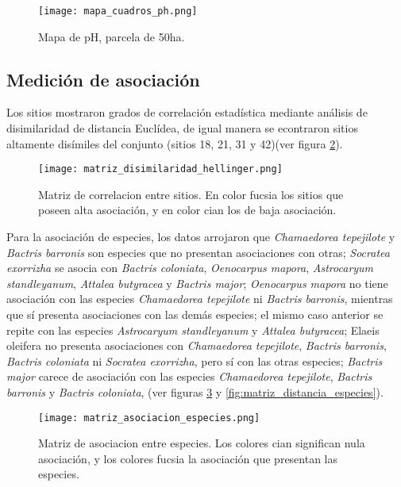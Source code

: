 \documentclass[11pt,]{article}
\begin{document}
\begin{figure}
\centering
\texttt{[image: mapa\_cuadros\_ph.png]}
\caption{Mapa de pH, parcela de 50ha. \label{fig:mapa_cuadros_pH}}
\end{figure}

\subsection{Medición de
asociación}\label{mediciuxf3n-de-asociaciuxf3n-1}

Los sitios mostraron grados de correlación estadística mediante análisis
de disimilaridad de distancia Euclídea, de igual manera se econtraron
sitios altamente disímiles del conjunto (sitios 18, 21, 31 y 42)(ver
figura \ref{fig:matriz_disimilaridad_hellinger}).

\begin{figure}
\centering
\texttt{[image: matriz\_disimilaridad\_hellinger.png]}
\caption{Matriz de correlacion entre sitios. En color fucsia los sitios
que poseen alta asociación, y en color cian los de baja asociación.
\label{fig:matriz_disimilaridad_hellinger}}
\end{figure}

Para la asociación de especies, los datos arrojaron que
\emph{Chamaedorea tepejilote} y \emph{Bactris barronis} son especies que
no presentan asociaciones con otras; \emph{Socratea exorrizha} se asocia
con \emph{Bactris coloniata}, \emph{Oenocarpus mapora},
\emph{Astrocaryum standleyanum}, \emph{Attalea butyracea} y
\emph{Bactris major}; \emph{Oenocarpus mapora} no tiene asociación con
las especies \emph{Chamaedorea tepejilote} ni \emph{Bactris barronis},
mientras que sí presenta asociaciones con las demás especies; el mismo
caso anterior se repite con las especies \emph{Astrocaryum standleyanum}
y \emph{Attalea butyracea}; Elaeis oleifera no presenta asociaciones con
\emph{Chamaedorea tepejilote}, \emph{Bactris barronis}, \emph{Bactris
coloniata} ni \emph{Socratea exorrizha}, pero sí con las otras especies;
\emph{Bactris major} carece de asociación con las especies
\emph{Chamaedorea tepejilote}, \emph{Bactris barronis} y \emph{Bactris
coloniata}, (ver figuras \ref{fig:matriz_asociacion_especies} y
\ref{fig:matriz_distancia_especies}).

\begin{figure}
\centering
\texttt{[image: matriz\_asociacion\_especies.png]}
\caption{Matriz de asociacion entre especies. Los colores cian
significan nula asociación, y los colores fucsia la asociación que
presentan las especies. \label{fig:matriz_asociacion_especies}}
\end{figure}
\end{document}

